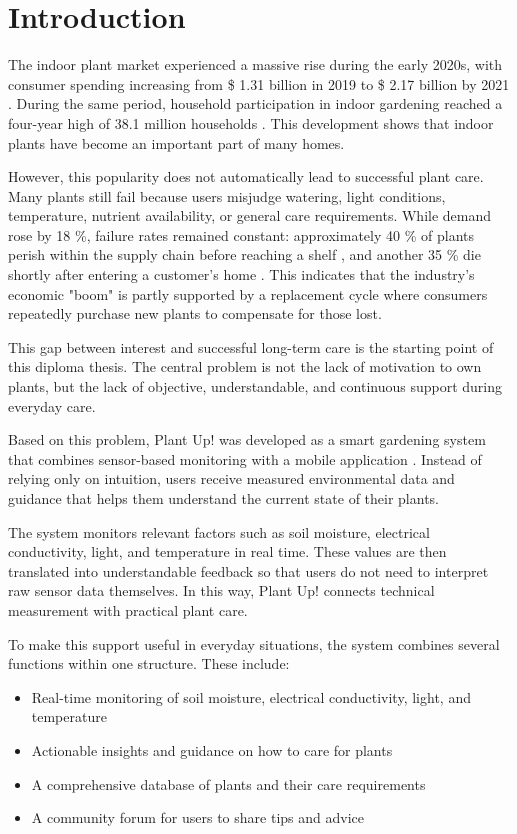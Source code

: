 \chapter{Introduction}

The indoor plant market experienced a massive rise during the early 2020s, with consumer spending increasing from \$ 1.31 billion in 2019 to \$ 2.17 billion by 2021 \cite{floristsReviewTrends}. During the same period, household participation in indoor gardening reached a four-year high of 38.1 million households \cite{kunrHouseplants2022}. This development shows that indoor plants have become an important part of many homes.

However, this popularity does not automatically lead to successful plant care. Many plants still fail because users misjudge watering, light conditions, temperature, nutrient availability, or general care requirements. While demand rose by 18 \%, failure rates remained constant: approximately 40 \% of plants perish within the supply chain before reaching a shelf \cite{mordorIndoorPlants}, and another 35 \% die shortly after entering a customer's home \cite{floralDailyKillPlants}. This indicates that the industry's economic "boom" is partly supported by a replacement cycle where consumers repeatedly purchase new plants to compensate for those lost.

This gap between interest and successful long-term care is the starting point of this diploma thesis. The central problem is not the lack of motivation to own plants, but the lack of objective, understandable, and continuous support during everyday care.

Based on this problem, Plant Up! was developed as a smart gardening system that combines sensor-based monitoring with a mobile application \cite{plantUpProject}. Instead of relying only on intuition, users receive measured environmental data and guidance that helps them understand the current state of their plants.

The system monitors relevant factors such as soil moisture, electrical conductivity, light, and temperature in real time. These values are then translated into understandable feedback so that users do not need to interpret raw sensor data themselves. In this way, Plant Up! connects technical measurement with practical plant care.

To make this support useful in everyday situations, the system combines several functions within one structure. These include:
\begin{itemize}
    \item Real-time monitoring of soil moisture, electrical conductivity, light, and temperature
    \item Actionable insights and guidance on how to care for plants
    \item A comprehensive database of plants and their care requirements
    \item A community forum for users to share tips and advice
\end{itemize}

